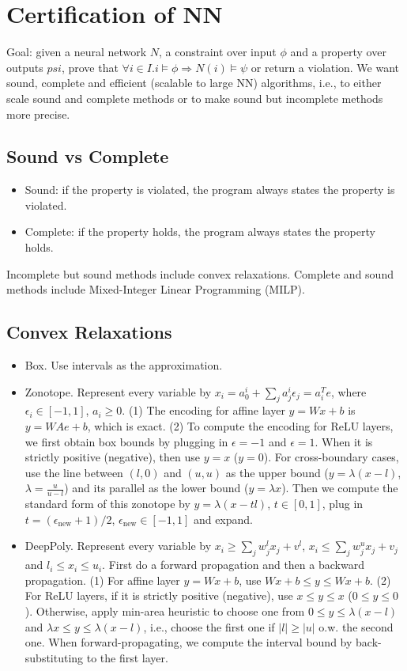 \section{Certification of NN}

Goal: given a neural network $N$, a constraint over input $\phi$ and a property over outputs $psi$, prove that $\forall i \in I . i \vDash \phi \Rightarrow N(i) \vDash \psi$ or return a violation. We want sound, complete and efficient (scalable to large NN) algorithms, i.e., to either scale sound and complete methods or to make sound but incomplete methods more precise.

\subsection*{Sound vs Complete}
\begin{itemize}
    \item Sound: if the property is violated, the program always states the property is violated.
    \item Complete: if the property holds, the program always states the property holds.
\end{itemize}

Incomplete but sound methods include convex relaxations. Complete and sound methods include Mixed-Integer Linear Programming (MILP).

\subsection*{Convex Relaxations}
\begin{itemize}
    \item Box. Use intervals as the approximation.
    \item Zonotope. Represent every variable by $x_i = a^i_0+\sum_j a_j^i \epsilon_j = a_i^T e$, where $\epsilon_i\in [-1,1]$, $a_i\ge 0$. (1) The encoding for affine layer $y=Wx+b$ is $y=W A e+b$, which is exact. (2) To compute the encoding for ReLU layers, we first obtain box bounds by plugging in $\epsilon=-1$ and $\epsilon=1$. When it is strictly positive (negative), then use $y=x$ ($y=0$). For cross-boundary cases, use the line between $(l,0)$ and $(u,u)$ as the upper bound ($y=\lambda(x-l)$, $\lambda=\frac{u}{u-l}$) and its parallel as the lower bound ($y=\lambda x$). Then we compute the standard form of this zonotope by $y = \lambda(x-tl)$, $t\in [0,1]$, plug in $t=(\epsilon_{\text{new}}+1)/2$, $\epsilon_{\text{new}}\in [-1,1]$ and expand.
    \item DeepPoly. Represent every variable by $x_i \ge \sum_j w^l_j x_j + v^l$, $x_i \le \sum_j w^u_j x_j +v_j$ and $l_i \le x_i \le u_i$. First do a forward propagation and then a backward propagation. (1) For affine layer $y=Wx+b$, use $Wx+b\le y\le Wx+b$. (2) For ReLU layers, if it is strictly positive (negative), use $x\le y\le x$ ($0\le y\le 0$). Otherwise, apply min-area heuristic to choose one from $0\le y\le \lambda(x-l)$ and $\lambda x\le y \le \lambda(x-l)$, i.e., choose the first one if $|l|\ge|u|$ o.w. the second one. When forward-propagating, we compute the interval bound by back-substituting to the first layer.
\end{itemize}

